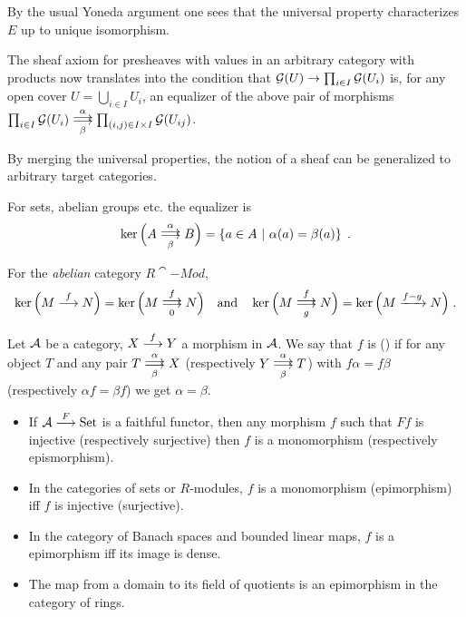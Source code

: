 \documentclass[a4paper,parskip=half,numbers=enddot, DIV=12]{scrreprt}
\begin{document}
	\begin{rem*}
		\begin{alphanumerate}
			\item By the usual Yoneda argument one sees that the universal property characterizes $E$ up to unique isomorphism.
			\item The sheaf axiom for presheaves with values in an arbitrary category with products now translates into the condition that $\mathcal{G}(U)\to\prod_{i\in I}\mathcal{G}(U_i)$ is, for any open cover $U=\bigcup_{i\in I}U_i$, an equalizer of the above pair of morphisms $\prod_{i\in I}\Gg(U_i)\doublemorphism[\alpha][\beta]\prod_{(i,j)\in I\times I}\Gg(U_{ij})$. 
			
			By merging the universal properties, the notion of a sheaf can be generalized to arbitrary target categories.
			\item For sets, abelian groups etc. the equalizer is 
			\begin{align*}
				\ker\Big(A\doublemorphism[\alpha][\beta]B\Big)=\left\{a\in A\st \alpha(a)=\beta(a)\right\}\;.
			\end{align*}
			\item For the \emph{abelian} category $R\cat{-Mod}$, 
			\begin{align*}
				\ker\Big(M\morphism[f]N\Big)=\ker\Big(M\doublemorphism[f][0]N\Big)\quad\text{and}\quad\ker\Big(M\doublemorphism[f][g]N\Big)=\ker\Big(M\xrightarrow{f-g}N\Big)\;.
			\end{align*}
		\end{alphanumerate}
	\end{rem*}
	\begin{defi}
		Let $\mathcal{A}$ be a category, $X\morphism[f] Y$ a morphism in $\mathcal{A}$. We say that $f$ is  () if for any object $T$ and any pair $T \doublemorphism[\alpha][\smash{\beta}] X$ (respectively $Y\doublemorphism[\smash{\alpha}][\beta] T$) with $f\alpha = f\beta$ (respectively $\alpha f= \beta f$) we get $\alpha =\beta$.
	\end{defi}
	\begin{rem*}
        \begin{itemize}
          \item 
            If $\Aa\morphism[F] \operatorname{Set}$ is a faithful functor, then any morphism $f$ such that $Ff$ is injective (respectively surjective) then $f$ is a monomorphism (respectively epismorphism). 
          \item
            In the categories of sets or $R$-modules, $f$ is a monomorphism (epimorphism) iff $f$ is injective (surjective).
          \item
            In the category of Banach spaces and bounded linear maps, $f$ is a epimorphism iff its image is dense.
          \item
            The map from a domain to its field of quotients is an epimorphism in the category of rings.
        \end{itemize}
	\end{rem*}
\end{document}
